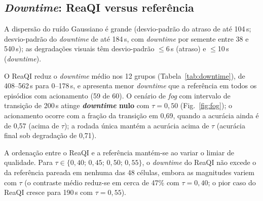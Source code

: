 \documentclass[conference]{IEEEtran}
\begin{document}
\subsection{\textit{Downtime}: ReaQI versus referência}
\begin{table}[!t]
\centering
\caption{\textit{Downtime} (s): ReaQI versus referência pareada sem retreinamento (médias por grupo sobre 5 sementes; formato: reativo / referência).}
\label{tab:downtime}
\small
{}
\vspace{2pt}
{\footnotesize A dispersão do ruído Gaussiano é grande (desvio-padrão do atraso de até 104\,s;
desvio-padrão do \textit{downtime} de até 184\,s, com \textit{downtime} por semente entre 38 e 540\,s); as degradações visuais têm desvio-padrão
$\le$6\,s (atraso) e $\le$10\,s (\textit{downtime}).}
\end{table}
O ReaQI reduz o \textit{downtime} médio nos 12 grupos (Tabela~\ref{tab:downtime}), de 408--562\,s para 0--178\,s, e apresenta menor \textit{downtime} que a referência em todos os episódios com acionamento (59 de 60). O cenário de \textit{fog} com intervalo de transição de 200\,s atinge \textbf{\textit{downtime} nulo} com $\tau=0{,}50$ (Fig.~\ref{fig:fog}); o acionamento ocorre com a fração da transição em 0,69, quando a acurácia ainda é de 0,57 (acima de $\tau$); a rodada única mantém a acurácia acima de $\tau$ (acurácia final sob degradação de 0,71).

A ordenação entre o ReaQI e a referência mantém-se ao variar o limiar de qualidade. Para $\tau \in \{0{,}40;\,0{,}45;\,0{,}50;\,0{,}55\}$, o \textit{downtime} do ReaQI não excede o da referência pareada em nenhuma das 48 células, embora as magnitudes variem com $\tau$ (o contraste médio reduz-se em cerca de 47\% com $\tau=0{,}40$; o pior caso do ReaQI cresce para 190\,s com $\tau=0{,}55$).
\end{document}
